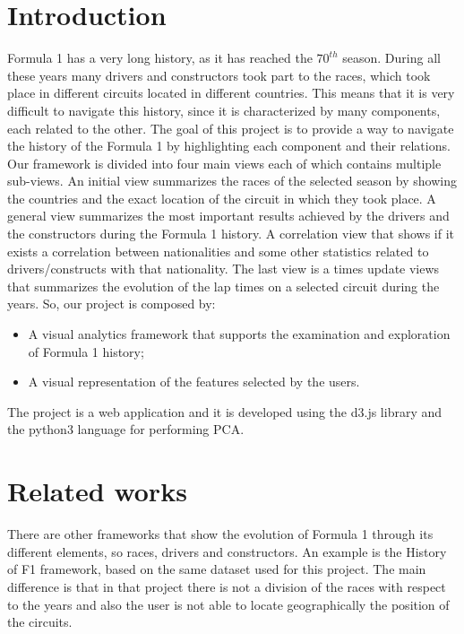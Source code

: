 \documentclass[11pt,twocolumn,letterpaper]{article}
\begin{document}
\section{Introduction}
Formula 1 has a very long history, as it has reached the $70^{th}$ season. During all these years many drivers and constructors took part to the races, which took
place in different circuits located in different countries. This means that it is very difficult to navigate this history, since it is characterized by many components,
each related to the other. The goal of this project is to provide a way to navigate the history of the Formula 1 by highlighting each component and their relations.
Our framework is divided into four main views each of which contains multiple sub-views. An initial view summarizes the races of the selected season by showing
the countries and the exact location of the circuit in which they took place. A general view summarizes the most important results achieved by the drivers and the
constructors during the Formula 1 history. A correlation view that shows if it exists a correlation between nationalities and some other statistics related to 
drivers/constructs with that nationality.
The last view is a times update views that summarizes the evolution of the lap times on a selected circuit during the years. So, our project is composed by:
\begin{itemize}
	\item A visual analytics framework that supports the examination and exploration of Formula 1 history;
	\item A visual representation of the features selected by the users.
\end{itemize}
The project is a web application and it is developed using the d3.js \cite{D3} library and the python3 language for performing PCA.

\section{Related works}
There are other frameworks that show the evolution of Formula 1 through its different elements, so races, drivers and constructors. An example is the History of F1
\cite{HistoryOfF1} framework, based on the same dataset used for this project. The main difference is that in that project
there is not a division of the races with respect to the years and also the user is not able to locate geographically the position of the circuits. 
\end{document}
